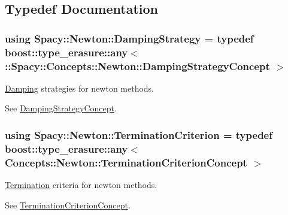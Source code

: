 \subsection{Typedef Documentation}
\hypertarget{namespaceSpacy_1_1Newton_ae2ba8821b209bfac2ab9190e6283cf06_ae2ba8821b209bfac2ab9190e6283cf06}{}
\subsubsection[{Damping\+Strategy}]{\setlength{\rightskip}{0pt plus 5cm}using {\bf Spacy\+::\+Newton\+::\+Damping\+Strategy} = typedef boost\+::type\+\_\+erasure\+::any$<$ \+::{\bf Spacy\+::\+Concepts\+::\+Newton\+::\+Damping\+Strategy\+Concept} $>$}\label{namespaceSpacy_1_1Newton_ae2ba8821b209bfac2ab9190e6283cf06_ae2ba8821b209bfac2ab9190e6283cf06}


\hyperlink{namespaceSpacy_1_1Newton_1_1Damping}{Damping} strategies for newton methods. 

\label{namespaceSpacy_1_1Newton_ae2ba8821b209bfac2ab9190e6283cf06_Newton_DampingStrategyAnchor}%
\hypertarget{namespaceSpacy_1_1Newton_ae2ba8821b209bfac2ab9190e6283cf06_Newton_DampingStrategyAnchor}{}%
See \hyperlink{group__NewtonConceptGroup_ga8da917ba6de9c283c1509281956bb04a_Newton_DampingStrategyConceptAnchor}{Damping\+Strategy\+Concept}. \hypertarget{namespaceSpacy_1_1Newton_abfa64b52531032d7a5fe6d0ec1a3cbd5_abfa64b52531032d7a5fe6d0ec1a3cbd5}{}
\subsubsection[{Termination\+Criterion}]{\setlength{\rightskip}{0pt plus 5cm}using {\bf Spacy\+::\+Newton\+::\+Termination\+Criterion} = typedef boost\+::type\+\_\+erasure\+::any$<$ {\bf Concepts\+::\+Newton\+::\+Termination\+Criterion\+Concept} $>$}\label{namespaceSpacy_1_1Newton_abfa64b52531032d7a5fe6d0ec1a3cbd5_abfa64b52531032d7a5fe6d0ec1a3cbd5}


\hyperlink{namespaceSpacy_1_1Newton_1_1Termination}{Termination} criteria for newton methods. 

\label{namespaceSpacy_1_1Newton_abfa64b52531032d7a5fe6d0ec1a3cbd5_Newton_TerminationCriterionAnchor}%
\hypertarget{namespaceSpacy_1_1Newton_abfa64b52531032d7a5fe6d0ec1a3cbd5_Newton_TerminationCriterionAnchor}{}%
See \hyperlink{group__NewtonConceptGroup_ga7d7604bea8b7c261d3179a7e95ffbe76_Newton_TerminationCriterionConceptAnchor}{Termination\+Criterion\+Concept}. 

